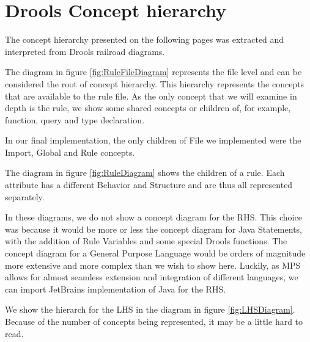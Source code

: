 \chapter{Drools Concept hierarchy}
\label{appendix:DroolsConceptHierarchy}

The concept hierarchy presented on the following pages was extracted and interpreted from Drools railroad diagrams.

The diagram in figure \ref{fig:RuleFileDiagram} represents the file level and can be considered the root of concept hierarchy.
This hierarchy represents the concepts that are available to the rule file.
As the only concept that we will examine in depth is the rule, we show some shared concepts or children of, for example, function, query and type declaration.

In our final implementation, the only children of File we implemented were the Import, Global and Rule concepts.

The diagram in figure \ref{fig:RuleDiagram} shows the children of a rule.
Each attribute has a different Behavior and Structure and are thus all represented separately.

In these diagrams, we do not show a concept diagram for the RHS.
This choice was because it would be more or less the concept diagram for Java Statements, with the addition of Rule Variables and some special Drools functions.
The concept diagram for a General Purpose Language would be orders of magnitude more extensive and more complex than we wish to show here.
Luckily, as MPS allows for almost seamless extension and integration of different languages, we can import JetBrains implementation of Java for the RHS.

We show the hierarch for the LHS in the diagram in figure \ref{fig:LHSDiagram}.
Because of the number of concepts being represented, it may be a little hard to read.

 

